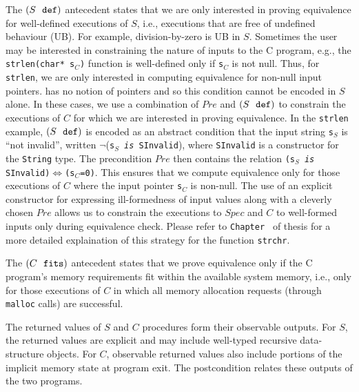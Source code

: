 The $(S\ \  \mathrm{\tt def})$ antecedent states that we are only
interested in proving equivalence for well-defined
executions of $S$, i.e., executions that are
free of undefined
behaviour (UB). For example, division-by-zero is UB
in $S$.
Sometimes
the user may be interested in constraining the nature of
inputs to the C program, e.g., the {\tt strlen(char* s$_C$)} function
is well-defined only if {\tt s$_C$} is not null.
Thus,
for {\tt strlen}, we are only interested in computing
equivalence for non-null input pointers. \SpecL{} has
no notion of pointers and so this condition cannot be encoded
in $S$ alone.
In these cases, we use a combination of
$Pre$ and $(S\ \  \mathrm{\tt def})$
to constrain the executions of $C$ for which we
are interested in proving equivalence. In the {\tt strlen} example,
$(S\ \  \mathrm{\tt def})$
is encoded as an
abstract condition that the input string {\tt s}$_S$ is ``not invalid'',
written $\neg$({\tt s$_S$ {\em is} SInvalid}), where {\tt SInvalid} is
a constructor for the \SpecL{} {\tt String} type.
The precondition $Pre$ then contains the relation {\tt (s$_S$ {\em is} SInvalid)$\Leftrightarrow$({\tt s$_C$}=0)}.
This ensures that we compute equivalence only for those executions
of $C$ where the input pointer {\tt s$_C$} is non-null.
The use of an explicit constructor for expressing ill-formedness
of \SpecL{} input values along with a cleverly chosen $Pre$ allows us
to constrain the executions to $Spec$ and $C$ to well-formed inputs
only during equivalence check.
Please refer to {\tt Chapter \ThesisChapterEval{}} of thesis for
a more detailed explaination of this strategy for
the function {\tt strchr}.

The $(C\ \  \mathrm{\tt fits})$ antecedent states that we
prove equivalence only if the C program's memory requirements
fit within the available system memory, i.e.,
only for those executions of $C$ in which all
memory allocation requests (through {\tt malloc} calls)
are successful.

The returned values of $S$ and
$C$ procedures form their observable outputs.
For $S$, the returned values are
explicit and may include well-typed
recursive data-structure objects.
For $C$,
observable returned values also include portions
of the implicit memory state at
program exit. The postcondition relates these outputs of
the two programs.

